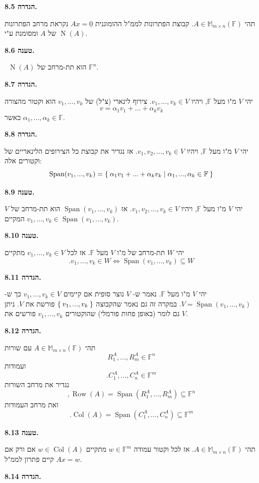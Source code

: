 \documentclass[12pt]{report}
\theoremstyle{plain}
\theoremstyle{definition}
\newcommand{\F}{\mathbb{F}}
\newcommand{\M}{\mathbb{M}}
\newcommand{\0}{\mathbf{0}}
\DeclareMathOperator{\Span}{Span}
\DeclareMathOperator{\Row}{Row}
\DeclareMathOperator{\Col}{Col}
\DeclareMathOperator{\Null}{N}
\begin{document}
\noindent\textbf{הגדרה 8.5.}

תהי
$A\in\M_{m\times n}(\F)$.
קבוצת הפתרונות לממ"ל ההומוגנית
$Ax=\underline{0}$
נקראת מרחב הפתרונות של 
$A$
ומסומנת ע"י 
$\Null(A)$.
\bigskip
\bigskip

\noindent\textbf{טענה 8.6.}

\
$\Null(A)$
הוא תת-מרחב של
$\F^n$.
\bigskip
\bigskip

\noindent\textbf{הגדרה 8.7.}

יהי 
$V$
מ"ו מעל
$\F$,
ויהיו
$v_1,...,v_k\in V$.
צירוף לינארי (צ"ל) של
$v_1,...,v_k$
הוא וקטור מהצורה
$$
v=\alpha_1v_1+...+\alpha_kv_k
$$
כאשר
$\alpha_1,...,\alpha_k\in\F$.
\bigskip
\bigskip

\noindent\textbf{הגדרה 8.8.}

יהי 
$V$
מ"ו מעל
$\F$,
ויהיו 
$v_1,v_2,...,v_k\in V$.
אז נגדיר את קבוצת כל הצירופים הלינאריים של וקטורים אלה:
$$
\Span(v_1,...,v_k)=\Set{\alpha_1v_1+...+\alpha_kv_k|\alpha_1,...,\alpha_k\in\F}
$$
\bigskip
\bigskip

\noindent\textbf{טענה 8.9.}

יהי
$V$
מ"ו מעל
$\F$,
ויהיו 
$v_1,v_2,...,v_k\in V$.
אז
$\Span(v_1,...,v_k)$
הוא תת-מרחב של
$V$
המקיים
$v_1,...,v_k\in \Span(v_1,...,v_k)$.
\bigskip
\bigskip

\noindent\textbf{טענה 8.10.}

יהי
$W$
תת-מרחב של מ"ו
$V$
מעל 
$\F$.
אז לכל
$v_1,...,v_k\in V$
מתקיים
$$
.v_1,...,v_k\in W \iff \Span(v_1,...,v_k)\subseteq W
$$
\bigskip
\bigskip

\noindent\textbf{הגדרה 8.11.}

יהי 
$V$
מ"ו מעל
$\F$.
נאמר ש-
$V$
נוצר סופית אם קיימים
$v_1,...,v_k\in V$
כך ש-
$V=\Span(v_1,...,v_k)$.
במקרה זה גם נאמר שהקבוצה
$\Set{v_1,...,v_k}$
פורשת את
$V$.
ניתן גם לומר (באופן פחות פורמלי) שהוקטורים
$v_1,...,v_k$
פורשים את 
$V$.
\bigskip
\bigskip

\noindent\textbf{הגדרה 8.12.}

תהי 
$A\in\M_{m\times n}(\F)$
עם שורות
$$R_1^A,...,R_m^A\in\F^n$$
ועמודות
$$.C_1^A,...,C_n^A\in\F^m$$
נגדיר את מרחב השורות
$$
,\Row(A)=\Span(R_1^A,...,R_m^A)\subseteq\F^n
$$
ואת מרחב העמודות
$$
.\Col(A)=\Span(C_1^A,...,C_n^A)\subseteq\F^m
$$
\bigskip
\bigskip

\noindent\textbf{טענה 8.13.}

תהי
$A\in\M_{m\times n}(\F)$.
אז לכל וקטור עמודה 
$w\in\F^m$
מתקיים
$w\in\Col(A)$
אם ורק אם קיים פתרון לממ"ל
$Ax=w$.
\bigskip
\bigskip

\noindent\textbf{הגדרה 8.14.}
\end{document}
